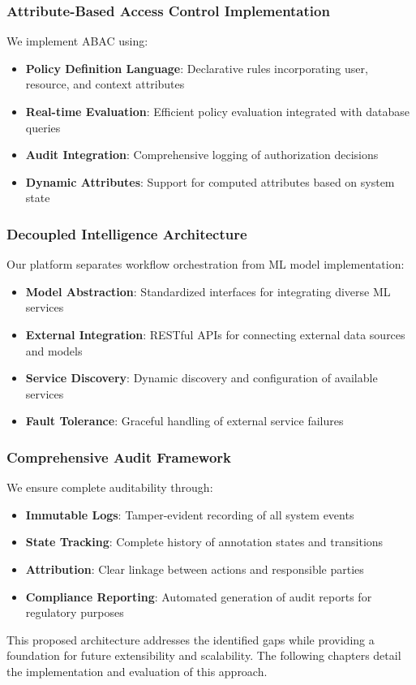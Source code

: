 \subsubsection{Attribute-Based Access Control Implementation}

We implement ABAC using:

\begin{itemize}
    \item \textbf{Policy Definition Language}: Declarative rules incorporating user, resource, and context attributes
    \item \textbf{Real-time Evaluation}: Efficient policy evaluation integrated with database queries
    \item \textbf{Audit Integration}: Comprehensive logging of authorization decisions
    \item \textbf{Dynamic Attributes}: Support for computed attributes based on system state
\end{itemize}

\subsubsection{Decoupled Intelligence Architecture}

Our platform separates workflow orchestration from ML model implementation:

\begin{itemize}
    \item \textbf{Model Abstraction}: Standardized interfaces for integrating diverse ML services
    \item \textbf{External Integration}: RESTful APIs for connecting external data sources and models
    \item \textbf{Service Discovery}: Dynamic discovery and configuration of available services
    \item \textbf{Fault Tolerance}: Graceful handling of external service failures
\end{itemize}

\subsubsection{Comprehensive Audit Framework}

We ensure complete auditability through:

\begin{itemize}
    \item \textbf{Immutable Logs}: Tamper-evident recording of all system events
    \item \textbf{State Tracking}: Complete history of annotation states and transitions
    \item \textbf{Attribution}: Clear linkage between actions and responsible parties
    \item \textbf{Compliance Reporting}: Automated generation of audit reports for regulatory purposes
\end{itemize}

This proposed architecture addresses the identified gaps while providing a foundation for future extensibility and scalability. The following chapters detail the implementation and evaluation of this approach. 